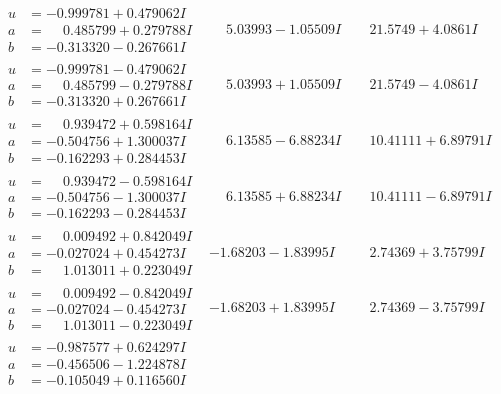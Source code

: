 \documentclass[1p]{elsarticle_modified}
\theoremstyle{definition}
\begin{document}
$$\begin{array}{c|c|c}
\begin{aligned}
u &= -0.999781 + 0.479062 I \\
a &= \phantom{-}0.485799 + 0.279788 I \\
b &= -0.313320 - 0.267661 I\end{aligned}
 & \phantom{-}5.03993 - 1.05509 I & \phantom{-}21.5749 + 4.0861 I \\ \hline\begin{aligned}
u &= -0.999781 - 0.479062 I \\
a &= \phantom{-}0.485799 - 0.279788 I \\
b &= -0.313320 + 0.267661 I\end{aligned}
 & \phantom{-}5.03993 + 1.05509 I & \phantom{-}21.5749 - 4.0861 I \\ \hline\begin{aligned}
u &= \phantom{-}0.939472 + 0.598164 I \\
a &= -0.504756 + 1.300037 I \\
b &= -0.162293 + 0.284453 I\end{aligned}
 & \phantom{-}6.13585 - 6.88234 I & \phantom{-}10.41111 + 6.89791 I \\ \hline\begin{aligned}
u &= \phantom{-}0.939472 - 0.598164 I \\
a &= -0.504756 - 1.300037 I \\
b &= -0.162293 - 0.284453 I\end{aligned}
 & \phantom{-}6.13585 + 6.88234 I & \phantom{-}10.41111 - 6.89791 I \\ \hline\begin{aligned}
u &= \phantom{-}0.009492 + 0.842049 I \\
a &= -0.027024 + 0.454273 I \\
b &= \phantom{-}1.013011 + 0.223049 I\end{aligned}
 & -1.68203 - 1.83995 I & \phantom{-}2.74369 + 3.75799 I \\ \hline\begin{aligned}
u &= \phantom{-}0.009492 - 0.842049 I \\
a &= -0.027024 - 0.454273 I \\
b &= \phantom{-}1.013011 - 0.223049 I\end{aligned}
 & -1.68203 + 1.83995 I & \phantom{-}2.74369 - 3.75799 I \\ \hline\begin{aligned}
u &= -0.987577 + 0.624297 I \\
a &= -0.456506 - 1.224878 I \\
b &= -0.105049 + 0.116560 I\end{aligned}

\end{array}$$
\end{document}
